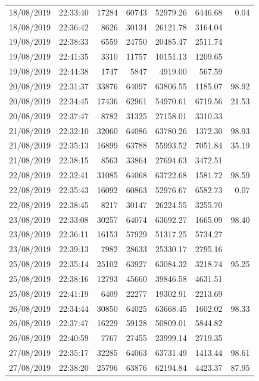 \begin{longtable}{llrrrrr}
18/08/2019 & 22:33:40 & 17284 & 60743 & 52979.26 & 6446.68 & 0.04 \\
18/08/2019 & 22:36:42 & 8626 & 30134 & 26121.78 & 3164.04 &  \\
19/08/2019 & 22:38:33 & 6559 & 24750 & 20485.47 & 2511.74 &  \\
19/08/2019 & 22:41:35 & 3310 & 11757 & 10151.13 & 1209.65 &  \\
19/08/2019 & 22:44:38 & 1747 & 5847 & 4919.00 & 567.59 &  \\
20/08/2019 & 22:31:37 & 33876 & 64097 & 63806.55 & 1185.07 & 98.92 \\
20/08/2019 & 22:34:45 & 17436 & 62961 & 54970.61 & 6719.56 & 21.53 \\
20/08/2019 & 22:37:47 & 8782 & 31325 & 27158.01 & 3310.33 &  \\
21/08/2019 & 22:32:10 & 32060 & 64086 & 63780.26 & 1372.30 & 98.93 \\
21/08/2019 & 22:35:13 & 16899 & 63788 & 55993.52 & 7051.84 & 35.19 \\
21/08/2019 & 22:38:15 & 8563 & 33864 & 27694.63 & 3472.51 &  \\
22/08/2019 & 22:32:41 & 31085 & 64068 & 63722.68 & 1581.72 & 98.59 \\
22/08/2019 & 22:35:43 & 16092 & 60863 & 52976.67 & 6582.73 & 0.07 \\
22/08/2019 & 22:38:45 & 8217 & 30147 & 26224.55 & 3255.70 &  \\
23/08/2019 & 22:33:08 & 30257 & 64074 & 63692.27 & 1665.09 & 98.40 \\
23/08/2019 & 22:36:11 & 16153 & 57929 & 51317.25 & 5734.27 &  \\
23/08/2019 & 22:39:13 & 7982 & 28633 & 25330.17 & 2795.16 &  \\
25/08/2019 & 22:35:14 & 25102 & 63927 & 63084.32 & 3218.74 & 95.25 \\
25/08/2019 & 22:38:16 & 12793 & 45660 & 39846.58 & 4631.51 &  \\
25/08/2019 & 22:41:19 & 6409 & 22277 & 19302.91 & 2213.69 &  \\
26/08/2019 & 22:34:44 & 30850 & 64025 & 63668.45 & 1602.02 & 98.33 \\
26/08/2019 & 22:37:47 & 16229 & 59128 & 50809.01 & 5844.82 &  \\
26/08/2019 & 22:40:59 & 7767 & 27455 & 23999.14 & 2719.35 &  \\
27/08/2019 & 22:35:17 & 32285 & 64063 & 63731.49 & 1413.44 & 98.61 \\
27/08/2019 & 22:38:20 & 25796 & 63876 & 62194.84 & 4423.37 & 87.95 \\

\end{longtable}
